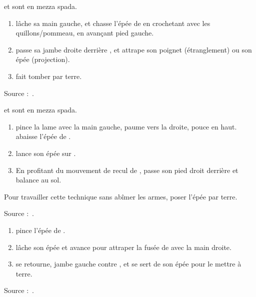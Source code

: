 \begin{technique}

\A et \D sont en mezza spada.

\begin{enumerate}
	\item \A lâche sa main gauche, et chasse l'épée de \D en crochetant avec les quillons/pommeau, en avançant pied gauche.
	\item \A passe sa jambe droite derrière \D, et attrape son poignet (étranglement) ou son épée (projection).
	\item \A fait tomber \D par terre.
\end{enumerate}

Source :~\cite{petit:dijon:close_longword:2015}.

\end{technique}


\begin{technique}

\A et \D sont en mezza spada.

\begin{enumerate}
	\item \A pince la lame avec la main gauche, paume vers la droite, pouce en haut.
		\A abaisse l'épée de \D.
	\item \A lance son épée sur \D.
	\item En profitant du mouvement de recul de \D, \A passe son pied droit derrière et balance \D au sol.
\end{enumerate}

Pour travailler cette technique sans abîmer les armes, poser l'épée par terre.

Source :~\cite{petit:dijon:close_longword:2015}.

\end{technique}


\begin{technique}

\begin{enumerate}
	\item \A pince l'épée de \D.
	\item \A lâche son épée et avance pour attraper la fusée de \D avec la main droite.
	\item \A se retourne, jambe gauche contre \D, et se sert de son épée pour le mettre à terre.
\end{enumerate}

Source :~\cite{petit:dijon:close_longword:2015}.

\end{technique}


